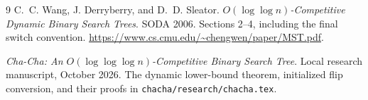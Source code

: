 \documentclass[11pt]{article}
\begin{document}
\begin{thebibliography}{9}
C.~C. Wang, J. Derryberry, and D.~D. Sleator.
\emph{$O(\log\log n)$-Competitive Dynamic Binary Search Trees}.
SODA 2006. Sections 2--4, including the final switch convention.
\url{https://www.cs.cmu.edu/~chengwen/paper/MST.pdf}.

\emph{Cha-Cha: An $O(\log\log\log n)$-Competitive Binary Search
Tree}. Local research manuscript, October 2026.
The dynamic lower-bound theorem, initialized flip conversion, and
their proofs in
\texttt{chacha/research/chacha.tex}.
\end{thebibliography}
\end{document}
